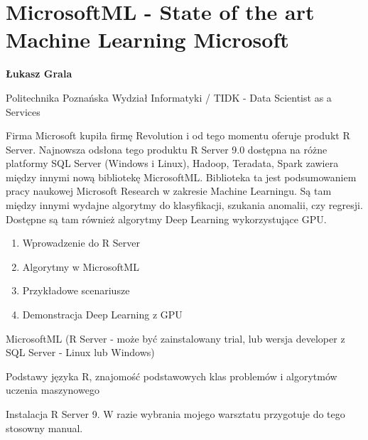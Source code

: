 \documentclass[\main/boa.tex]{subfiles}
\begin{document}
\section{MicrosoftML - State of the art Machine Learning Microsoft}

\begin{minipage}{0.915\textwidth}
\centering
{\bf {} Łukasz Grala}
\end{minipage}

\vskip 0.3cm

\begin{affiliations}
\begin{minipage}{0.915\textwidth}
\centering
\large Politechnika Poznańska Wydział Informatyki / TIDK - Data Scientist as a Services  \\[2pt]
\end{minipage}
\end{affiliations}

\vskip 0.8cm

\opiswarsztatu Firma Microsoft kupiła firmę Revolution i od tego momentu oferuje produkt R Server. Najnowsza odsłona tego produktu R Server 9.0 dostępna na różne platformy SQL Server (Windows i Linux), Hadoop, Teradata, Spark zawiera między innymi nową bibliotekę MicrosoftML. Biblioteka ta jest podsumowaniem pracy naukowej Microsoft Research w zakresie Machine Learningu. Są tam między innymi wydajne algorytmy do klasyfikacji, szukania anomalii, czy regresji. Dostępne są tam również algorytmy Deep Learning wykorzystujące GPU.

\planwarsztatu
\begin{enumerate}
\item Wprowadzenie do R Server
\item Algorytmy w MicrosoftML
\item Przykładowe scenariusze
\item Demonstracja Deep Learning z GPU
\end{enumerate}	 

\pakiety MicrosoftML (R Server - może być zainstalowany trial, lub wersja developer z SQL Server - Linux lub Windows)

\umiejetnosci Podstawy języka R, znajomość podstawowych klas problemów i algorytmów uczenia maszynowego

\wymagania Instalacja R Server 9. W razie wybrania mojego warsztatu przygotuje do tego stosowny manual.
\end{document}
